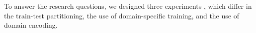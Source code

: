     To answer the research questions, we designed three experiments%
    , which differ in the train-test partitioning, the use of domain-specific training, and the use of domain encoding.  %
    
    
        

    



